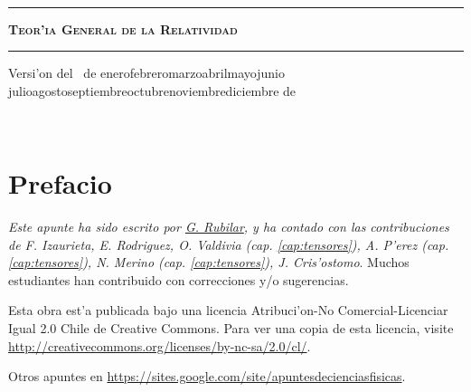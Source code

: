 \documentclass[letterpaper,11pt]{report}
\def\today{\number\day~de\space\ifcase\month\or
 enero\or febrero\or marzo\or abril\or mayo\or junio\or
 julio\or agosto\or septiembre\or octubre\or noviembre\or diciembre\fi
 \space de~\number\year}
\begin{document}
\thispagestyle{empty}
\begin{center}

\

\vspace{6.5cm}

\rule{15cm}{0.1cm}

\vspace{1.5cm}

{\huge \textsc{\textbf{Teor'ia General de la Relatividad}}}

\vspace{1.5cm}

\rule{15cm}{0.1cm}

\vspace{1.5cm}

Versi'on del \today

\end{center}


\newpage
\thispagestyle{empty}
\ \\
\newpage
\setcounter{page}{1}

\pagestyle{plain}
\chapter*{Prefacio}

\bigskip
\bigskip
\bigskip
\bigskip


\emph{Este apunte ha sido escrito por \href{https://google.com/+GuillermoRubilar}{G. Rubilar}, y ha contado con las contribuciones de F. Izaurieta, E. Rodriguez, O. Valdivia (cap. \ref{cap:tensores}), A. P'erez (cap. \ref{cap:tensores}), N. Merino (cap. \ref{cap:tensores}), J. Cris'ostomo}. Muchos estudiantes han contribuido con correcciones y/o sugerencias.


\bigskip
\bigskip
\bigskip
\bigskip
\bigskip
\bigskip



Esta obra est'a publicada bajo una licencia Atribuci'on-No Comercial-Licenciar Igual 2.0
Chile de Creative Commons. Para ver una copia de esta licencia, visite
\url{http://creativecommons.org/licenses/by-nc-sa/2.0/cl/}.


\bigskip
\bigskip
\bigskip
\bigskip
\bigskip
\bigskip

Otros apuntes en \url{https://sites.google.com/site/apuntesdecienciasfisicas}.

\bigskip
\bigskip
\bigskip
\bigskip
\bigskip
\bigskip
\end{document}
